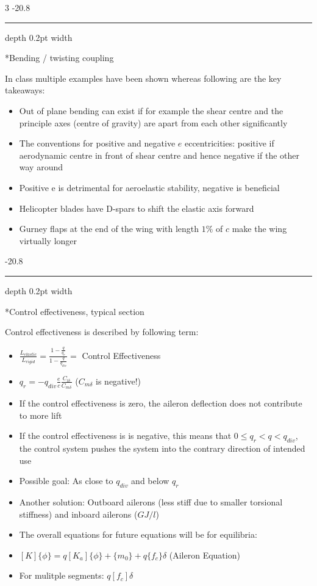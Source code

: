 \documentclass[8pt, landscape, fleqn]{scrartcl}
\makeatletter
\renewcommand{\subsubsection}{\@startsection{subsubsection}{1}{0mm}%
{-2\baselineskip}{0.8\baselineskip}%
{\hrule depth 0.2pt width\columnwidth\vspace*{1.2em}\normalsize\bfseries\rmfamily}}
\makeatother
\begin{document}
\begin{multicols*}{3}
\subsubsection*{Bending / twisting coupling}

In class multiple examples have been shown whereas following are the key takeaways:

\begin{itemize}
    \item Out of plane bending can exist if for example the shear centre and the principle axes (centre of gravity) are apart from each other significantly
    \item The conventions for positive and negative $e$ eccentricities: positive if aerodynamic centre in front of shear centre and hence negative if the other way around
    \item Positive e is detrimental for aeroelastic stability, negative is beneficial
    \item Helicopter blades have D-spars to shift the elastic axis forward
    \item Gurney flaps at the end of the wing with length $1\%$ of $c$ make the wing virtually longer 
\end{itemize}

\subsubsection*{Control effectiveness, typical section}

Control effectiveness is described by following term:

\begin{itemize}
    \item $\frac{L_{elastic}}{L_{rigid}} = \frac{1-\frac{q}{q_r}}{1-\frac{q}{q_{div}}} = $ Control Effectiveness
    \item $q_r = -q_{div}\frac{e}{c}\frac{C_{l\delta}}{C_{m\delta}}$ ($C_{m\delta}$ is negative!)
    \item If the control effectiveness is zero, the aileron deflection does not contribute to more lift
    \item If the control effectiveness is is negative, this means that $0 \leq q_r< q < q_{div}$, the control system pushes the system
    into the contrary direction of intended use
    \item Possible goal: As close to $q_{div}$ and below $q_r$
    \item Another solution: Outboard ailerons (less stiff due to smaller torsional stiffness) and inboard ailerons ($GJ/l$)
    \item The overall equations for future equations will be for equilibria:
    \item $[K]\{\phi \} =  q [K_a] \{\phi\} + \{m_0\} + q \{f_c\} \delta $ (Aileron Equation)
    \item For mulitple segments: $q [f_c] \delta$
\end{itemize}


\end{multicols*}
\end{document}
